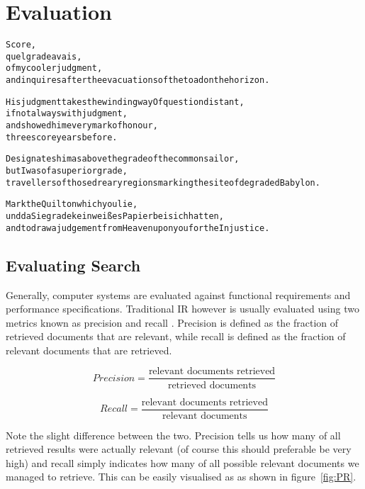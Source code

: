 
\chapter{Evaluation}
\label{ch:evaluation}

\startcontents[chapters]

\vfill

\begin{alltt}\sffamily
Score,
quel grade avais,
of my cooler judgment,
and inquires after the evacuations of the toad on the horizon.

His judgment takes the winding way Of question distant,
if not always with judgment,
and showed him every mark of honour,
three score years before.

Designates him as above the grade of the common sailor,
but I was of a superior grade,
travellers of those dreary regions marking the site of degraded Babylon.

Mark the Quilt on which you lie,
und da Sie grade kein weißes Papier bei sich hatten,
and to draw a judgement from Heaven upon you for the Injustice.
\end{alltt}

\newpage
\minicontents
\spirals

\section{Evaluating Search}
\label{s:evalsearch}

Generally, computer systems are evaluated against functional requirements and performance specifications. Traditional \ac{IR} however is usually evaluated using two metrics known as precision and recall \autocite{Baeza-Yates2011}. Precision is defined as the fraction of retrieved documents that are relevant, while recall is defined as the fraction of relevant documents that are retrieved.

\begin{equation}
  Precision = \frac{\text{relevant documents retrieved}}{\text{retrieved documents}}
  \label{eq:precision}
\end{equation}

\begin{equation}
  Recall = \frac{\text{relevant documents retrieved}}{\text{relevant documents}}
\label{eq:recall}
\end{equation}

Note the slight difference between the two. Precision tells us how many of all retrieved results were actually relevant (of course this should preferable be very high) and recall simply indicates how many of all possible relevant documents we managed to retrieve. This can be easily visualised as as shown in figure~\ref{fig:PR}.

